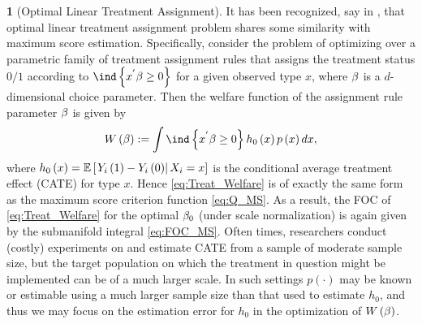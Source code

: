 \documentclass[12pt,american]{article}
\theoremstyle{definition}
\newtheorem{example}{\protect\examplename}
\theoremstyle{plain}
\theoremstyle{definition}
\theoremstyle{plain}
\theoremstyle{plain}
\theoremstyle{plain}
\theoremstyle{plain}
\theoremstyle{plain}
\newcommand{\E}{\mathbb{E}}
\providecommand{\examplename}{Example}
\providecommand{\examplename}{Example}
\begin{document}
%
\begin{example}[Optimal Linear Treatment Assignment]\label{exa:LinTreat}
  It has been recognized, say in \citet*{kitagawa2018should}, that
  optimal linear treatment assignment problem shares some similarity with maximum
  score estimation. Specifically, consider the problem of optimizing
  over a parametric family of treatment assignment rules that assigns the
  treatment status $0/1$ according to $\ind\left\{ x^{'}\b\geq0\right\} $
  for a given observed type $x$, where $\beta$ is a $d$-dimensional
  choice parameter. Then the welfare function of the assignment rule
  parameter $\beta$ is given by
  \begin{equation}
    W\left(\b\right):=\int\ind\left\{ x^{'}\b\geq0\right\} h_{0}\left(x\right)p\left(x\right)dx,\label{eq:Treat_Welfare}
  \end{equation}
  where $h_{0}\left(x\right)=\E\left[\rest{Y_{i}\left(1\right)-Y_{i}\left(0\right)}X_{i}=x\right]$
  is the conditional average treatment effect (CATE) for type $x$.
  Hence \eqref{eq:Treat_Welfare} is of exactly the same form as the
  maximum score criterion function \eqref{eq:Q_MS}. As a result, the
  FOC of \eqref{eq:Treat_Welfare} for the optimal $\beta_{0}$ (under scale normalization) is again
  given by the submanifold integral \eqref{eq:FOC_MS}. Often times,
  researchers conduct (costly) experiments on and estimate CATE
  from a sample of moderate sample size, but the target population on
  which the treatment in question might be implemented can be of a much
  larger scale. In such settings $p(\cdot)$ may be known or estimable
  using a much larger sample size than that used to estimate $h_{0}$,
  and thus we may focus on the estimation error for $h_{0}$ in the
  optimization of $W\left(\beta\right)$.
\end{example}
%
\end{document}

